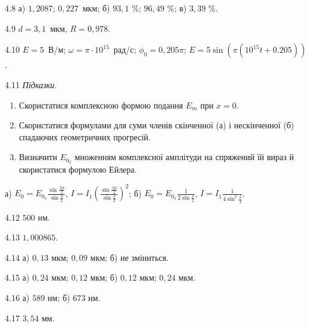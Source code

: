 \protect \section *{}
\begin{Solution}{4.{8}}
	а) $ 1,2087 $; $ 0,227 $~мкм; б) $ 93,1 $ \%; $ 96,49 $ \%; в) $ 3,39 $ \%.
\end{Solution}
\begin{Solution}{4.{9}}
    $ d =  3,1$~мкм, $ R=0,978 $.
\end{Solution}
\begin{Solution}{4.{10}}
	$ E = 5 $~В/м; $\omega = \pi\cdot10^{15}$~рад/с; $\phi_0 = 0,205\pi$; $ E = 5\sin(\pi(10^{15} t + 0.205)) $.
\end{Solution}
\begin{Solution}{4.{11}}
	\emph{Підказки}.
	\begin{enumerate}
		\item  Скористатися комплексною формою подання $E_m$ при $x = 0$.
		\item  Скористатися формулами для суми членів скінченної (а) і нескінченної (б) спадаючих
		      геометричних прогресій.
		\item  Визначити $ E_{0_2} $ множенням комплексної амплітуди на спряжений їй вираз й
		      скористатися формулою Ейлера.
	\end{enumerate}
	а) $ E_0 = E_{0_1} \frac{\sin\frac{N\delta}{2}}{\sin\frac{\delta}{2}} $, $ I = I_1 \left( \frac{\sin\frac{N\delta}{2}}{\sin\frac{\delta}{2}}\right)^2 $; б) $ E_0 = E_{0_1} \frac1{2\sin\frac{\delta}{2}} $, $ I = I_1 \frac1{4\sin^2\frac{\delta}{2}} $.
\end{Solution}
\begin{Solution}{4.{12}}
	$ 500 $ нм.
\end{Solution}
\begin{Solution}{4.{13}}
	$ 1,000865 $.
\end{Solution}
\begin{Solution}{4.{14}}
	а) $ 0,13 $ мкм; $ 0,09 $ мкм; б) не зміниться.
\end{Solution}
\begin{Solution}{4.{15}}
	а) $ 0,24 $ мкм; $ 0,12 $ мкм; б) $ 0,12 $ мкм; $ 0,24 $ мкм.
\end{Solution}
\begin{Solution}{4.{16}}
	а) $ 589 $ нм; б) $ 673 $ нм.
\end{Solution}
\begin{Solution}{4.{17}}
	$ 3,54 $ мм.
\end{Solution}
